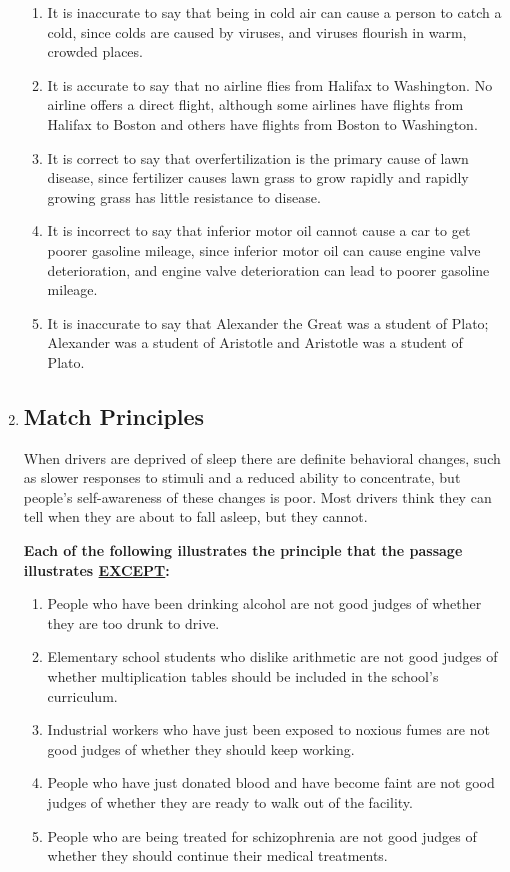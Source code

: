 \documentclass[9pt]{article}
\begin{document}
\begin{multicols}{3}
\begin{enumerate}
\begin{enumerate}[label=(\alph*)]
    \item It is inaccurate to say that being in cold air can cause a person to catch a cold, since colds are caused by viruses, and viruses flourish in warm, crowded places.
    \item It is accurate to say that no airline flies from Halifax to Washington. No airline offers a direct flight, although some airlines have flights from Halifax to Boston and others have flights from Boston to Washington.
    \item It is correct to say that overfertilization is the primary cause of lawn disease, since fertilizer causes lawn grass to grow rapidly and rapidly growing grass has little resistance to disease.
    \item It is incorrect to say that inferior motor oil cannot cause a car to get poorer gasoline mileage, since inferior motor oil can cause engine valve deterioration, and engine valve deterioration can lead to poorer gasoline mileage.
    \item It is inaccurate to say that Alexander the Great was a student of Plato; Alexander was a student of Aristotle and Aristotle was a student of Plato.
\end{enumerate}

\item
\subsection*{Match Principles}

\noindent
When drivers are deprived of sleep there are definite behavioral changes, such as slower responses to stimuli and a reduced ability to concentrate, but people's self-awareness of these changes is poor. Most drivers think they can tell when they are about to fall asleep, but they cannot.

 

\noindent
\textbf{Each of the following illustrates the principle that the passage illustrates \underline{EXCEPT}:}

\begin{enumerate}[label=(\alph*)]
    \item People who have been drinking alcohol are not good judges of whether they are too drunk to drive.
    \item Elementary school students who dislike arithmetic are not good judges of whether multiplication tables should be included in the school's curriculum.
    \item Industrial workers who have just been exposed to noxious fumes are not good judges of whether they should keep working.
    \item People who have just donated blood and have become faint are not good judges of whether they are ready to walk out of the facility.
    \item People who are being treated for schizophrenia are not good judges of whether they should continue their medical treatments.
\end{enumerate}



\end{enumerate}
\end{multicols}
\end{document}
